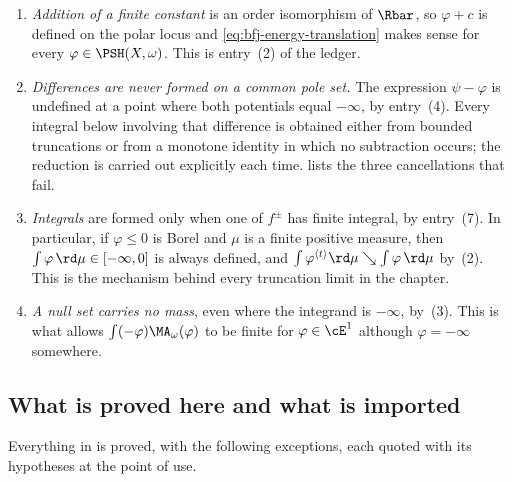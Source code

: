 \begin{enumerate}
\item\label{itm:ch26-ledger:add}
 \emph{Addition of a finite constant} is an order isomorphism of $\Rbar$, so
 $\varphi+c$ is defined on the polar locus and
 \eqref{eq:bfj-energy-translation} makes sense for every
 $\varphi\in\PSH(X,\omega)$.  This is entry~(2) of the ledger.
\item\label{itm:ch26-ledger:diff}
 \emph{Differences are never formed on a common pole set.}  The expression
 $\psi-\varphi$ is undefined at a point where both potentials equal
 $-\infty$, by entry~(4).  Every integral below involving that difference is
 obtained either from bounded truncations or from a monotone identity in which
 no subtraction occurs; the reduction is carried out explicitly each time.
  lists the three cancellations that fail.
\item\label{itm:ch26-ledger:integral}
 \emph{Integrals} are formed only when one of $f^\pm$ has finite integral,
 by entry~(7).  In particular, if $\varphi\leq0$ is Borel and $\mu$ is a
 finite positive measure, then $\int\varphi\,\rd\mu\in[-\infty,0]$ is always
 defined, and
 $\int\varphi^{\langle t\rangle}\rd\mu\searrow\int\varphi\,\rd\mu$ by
 \,(2).  This is the mechanism behind every
 truncation limit in the chapter.
\item\label{itm:ch26-ledger:null}
 \emph{A null set carries no mass}, even where the integrand is $-\infty$,
 by \,(3).  This is what allows
 $\int(-\varphi)\MA_\omega(\varphi)$ to be finite for
 $\varphi\in\cE^1$ although $\varphi=-\infty$ somewhere.
\end{enumerate}

\subsection{What is proved here and what is imported}
\label{sec:ch26-imported}

Everything in  is proved,
with the following exceptions, each quoted with its hypotheses at the point of
use.

